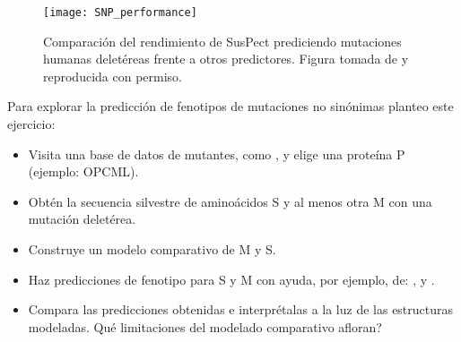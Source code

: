 \begin{figure}
\begin{center} 
\texttt{[image: SNP\_performance]}
\caption%
{
Comparaci\'{o}n del rendimiento de SusPect prediciendo mutaciones humanas delet\'{e}reas frente a otros predictores.
Figura tomada de \citep{Yates2014} y reproducida con permiso.
}
\label{fig:SNP_performance} %
\end{center}
\end{figure}

Para explorar la predicci\'{o}n de fenotipos de mutaciones no sin\'{o}nimas planteo este ejercicio:
\begin{itemize}

\item Visita una base de datos de mutantes, como , y elige una prote\'{i}na P (ejemplo: OPCML).

\item Obt\'{e}n la secuencia silvestre de amino\'{a}cidos S y al menos otra M con una mutaci\'{o}n delet\'{e}rea.

\item Construye un modelo comparativo de M y S.

\item Haz predicciones de fenotipo para S y M con ayuda, por ejemplo, de: , 
 y .

\item Compara las predicciones obtenidas e interpr\'{e}talas a la luz de las estructuras modeladas. 
Qu\'{e} limitaciones del modelado comparativo afloran?

\end{itemize}
